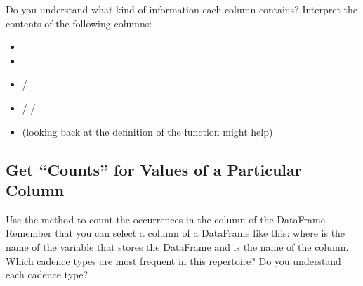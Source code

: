 \documentclass[letterpaper,10pt,english]{sphinxmanual}
\begin{document}
Do you understand what kind of information each column contains? Interpret the contents of the following columns:
\begin{itemize}
\item {} 

\item {} 

\item {} 
 / 

\item {} 
 /  / 

\item {} 
 (looking back at the definition of the  function might help)

\end{itemize}


\subsection{Get “Counts” for Values of a Particular Column}
\label{\detokenize{exercises/02_exercise:Get-_u201cCounts_u201d-for-Values-of-a-Particular-Column}}
Use the  method to count the occurrences in the  column of the DataFrame. Remember that you can select a column of a DataFrame like this:  where  is the name of the variable that stores the DataFrame and  is the name of the column. Which cadence types are most frequent in this repertoire? Do you understand each cadence type?

{
\begin{sphinxVerbatim}[commandchars=\\\{\}]
\llap{\color{nbsphinxin}[22]:\,\hspace{\fboxrule}\hspace{\fboxsep}}\PYG{p}{[}\PYG{p}{]}
\end{sphinxVerbatim}
}
\end{document}
